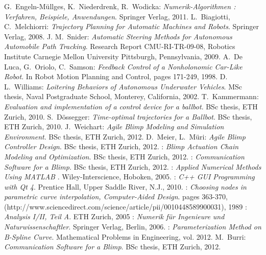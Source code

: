 \begin{thebibliography}{99}



 {\sc G.~Engeln-M{\"u}llges, K.~Niederdrenk, R.~Wodicka}:
{\it Numerik-Algorithmen : Verfahren, Beispiele, Anwendungen}. Springer Verlag, 2011.
 {\sc L.~Biagiotti, C.~Melchiorri}:
{\it Trajectory Planning for Automatic Machines and Robots}. Springer Verlag, 2008.
 {\sc J. M.~Snider}:
{\it Automatic Steering Methods for Autonomous Automobile Path Tracking}. Research Report CMU-RI-TR-09-08, Robotics Institute Carnegie Mellon University Pittsburgh, Pennsylvania, 2009.
 {\sc A.~De Luca, G.~Oriolo, C.~Samson}:
{\it Feedback Control of a Nonholonomic Car-Like Robot}. In Robot Motion Planning and Control, pages 171-249, 1998.
 {\sc D. L.~Williams}:
{\it Loitering Behaviors of Autonomous Underwater Vehicles}. MSc thesis, Naval Postgraduate School, Monterey, California, 2002.
 {\sc T.~Kammermann}:
{\it Evaluation and implementation of a control device for a ballbot}. BSc thesis, ETH Zurich, 2010.
 {\sc S.~D{\"o}ssegger}:
{\it Time-optimal trajectories for a Ballbot}. BSc thesis, ETH Zurich, 2010.
 {\sc J.~Weichart}:
{\it Agile Blimp Modeling and Simulation Environment}. BSc thesis, ETH Zurich, 2012.
 {\sc D.~Meier, L.~M{\"u}ri}:
{\it Agile Blimp Controller Design}. BSc thesis, ETH Zurich, 2012.
:
{\it Blimp Actuation Chain Modeling and Optimization}. BSc thesis, ETH Zurich, 2012.
:
{\it Communication Software for a Blimp}. BSc thesis, ETH Zurich, 2012.
:
{\it Applied Numerical Methods Using MATLAB} . Wiley-Interscience, Hoboken, 2005.
:
{\it C++ GUI Programming with Qt 4}. Prentice Hall, Upper Saddle River, N.J., 2010.
:
{\it Choosing nodes in parametric curve interpolation, Computer-Aided Design}. pages 363-370, (http://www.sciencedirect.com/science/article\-/pii/0010448589900031), 1989
:
{\it Analysis I/II, Teil A}. ETH Zurich, 2005
:
{\it Numerik f{\"u}r Ingenieure und Naturwissenschaftler}. Springer Verlag, Berlin, 2006.
:
{\it Parameterization Method on B-Spline Curve}. Mathematical Problems in Engineering, vol. 2012.
 {\sc M.~Burri}:
{\it Communication Software for a Blimp}. BSc thesis, ETH Zurich, 2012.

\end{thebibliography}
